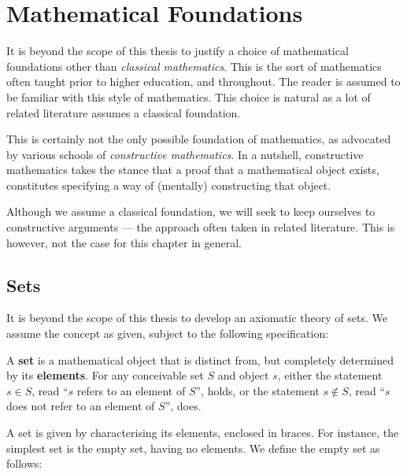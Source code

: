 \section{Mathematical Foundations}

\label{sec:preface:mathematical-foundations}

\def\strue{\ensuremath{\text{\textsc{True}}}}
\def\sfalse{\ensuremath{\text{\textsc{False}}}}

It is beyond the scope of this thesis to justify a choice of mathematical
foundations other than \emph{classical mathematics}. This is the sort of
mathematics often taught prior to higher education, and throughout. The reader
is assumed to be familiar with this style of mathematics. This choice is
natural as a lot of related literature assumes a classical foundation.

This is certainly not the only possible foundation of mathematics, as advocated
by various schools of \emph{constructive mathematics}. In a nutshell,
constructive mathematics takes the stance that a proof that a mathematical
object exists, constitutes specifying a way of (mentally) constructing that
object.

Although we assume a classical foundation, we will seek to keep ourselves to
constructive arguments --- the approach often taken in related literature. This
is however, not the case for this chapter in general.

\subsection{Sets}

It is beyond the scope of this thesis to develop an axiomatic theory of sets.
We assume the concept as given, subject to the following specification:

\begin{specification} A \textbf{set} is a mathematical object that is distinct
from, but completely determined by its \textbf{elements}. For any conceivable
set $S$ and object $s$, either the statement $s\in S$, read ``$s$ refers to an
element of $S$'', holds, or the statement $s\notin S$, read ``$s$ does not
refer to an element of $S$'', does. \end{specification}

A set is given by characterising its elements, enclosed in braces. For
instance, the simplest set is the empty set, having no elements. We define the
empty set as follows:


